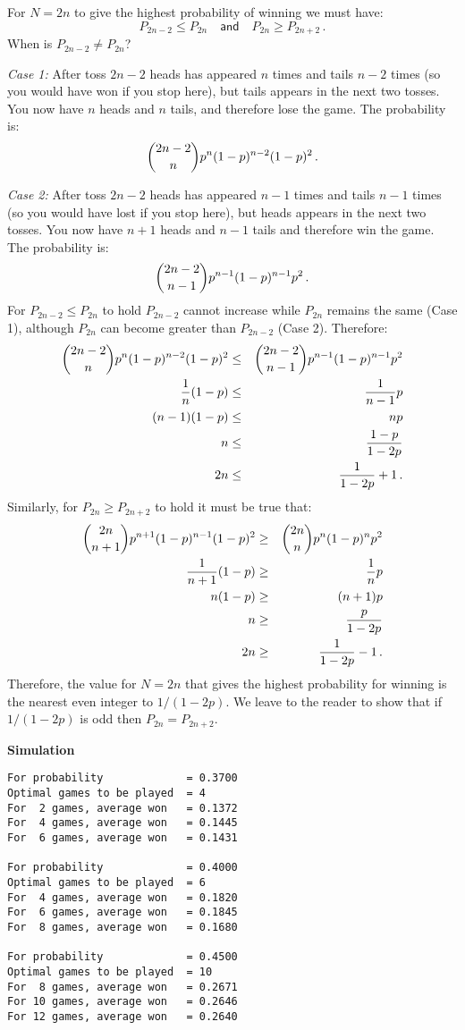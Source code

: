  For $N=2n$ to give the highest probability of winning we must have:
\[
P_{2n-2} \leq P_{2n} \quad \textsf{and} \quad P_{2n}\geq P_{2n+2}\,.
\]
When is $P_{2n-2}\not = P_{2n}$?

\textit{Case 1:}
After toss $2n-2$ heads has appeared $n$ times and tails  $n-2$ times (so you would have won if you stop here), but tails appears in the next two tosses. You now have $n$ heads and $n$ tails, and therefore lose the game. The probability is:
\[
\displaystyle{2n-2 \choose n}p^n(1-p)^{n-2} (1-p)^2\,.
\]

\textit{Case 2:}
After toss $2n-2$ heads has appeared $n-1$ times and tails $n-1$ times (so you would have lost if you stop here), but heads appears in the next two tosses. You now have $n+1$ heads and $n-1$ tails and therefore win the game. The probability is:
\[
\displaystyle{2n-2 \choose n-1}p^{n-1}(1-p)^{n-1} p^2\,.
\]
For $P_{2n-2}\leq P_{2n}$ to hold $P_{2n-2}$ cannot increase while $P_{2n}$ remains the same (Case 1), although $P_{2n}$ can become greater than $P_{2n-2}$ (Case 2). Therefore:
\begin{eqnarray*}
\displaystyle{2n-2 \choose n}p^n(1-p)^{n-2} (1-p)^2 &\leq&
\displaystyle{2n-2 \choose n-1}p^{n-1}(1-p)^{n-1} p^2\\
\displaystyle\frac{1}{n} (1-p) &\leq& \displaystyle\frac{1}{n-1} p\\
(n-1)(1-p) &\leq& np\\
n &\leq& \displaystyle\frac{1-p}{1-2p}\\
2n &\leq& \displaystyle\frac{1}{1-2p}+1\,.
\end{eqnarray*}
Similarly, for $P_{2n}\geq P_{2n+2}$ to hold it must be true that:
\begin{eqnarray*}
\displaystyle{2n \choose n+1}p^{n+1}(1-p)^{n-1}  (1-p)^2 &\geq&
\displaystyle{2n \choose n}p^{n}(1-p)^{n}  p^2\\
\displaystyle\frac{1}{n+1} (1-p) &\geq& \displaystyle\frac{1}{n} p\\
n(1-p)&\geq& (n+1)p\\
n &\geq& \displaystyle\frac{p}{1-2p}\\
2n &\geq&\displaystyle\frac{1}{1-2p}-1\,.
\end{eqnarray*}
Therefore, the value for $N=2n$ that gives the highest probability for winning is the nearest even integer to $1/(1-2p)$. We leave to the reader to show that if $1/(1-2p)$ is odd then $P_{2n}=P_{2n+2}$.

\textbf{Simulation}
\begin{verbatim}
For probability             = 0.3700
Optimal games to be played  = 4
For  2 games, average won   = 0.1372
For  4 games, average won   = 0.1445
For  6 games, average won   = 0.1431

For probability             = 0.4000
Optimal games to be played  = 6
For  4 games, average won   = 0.1820
For  6 games, average won   = 0.1845
For  8 games, average won   = 0.1680

For probability             = 0.4500
Optimal games to be played  = 10
For  8 games, average won   = 0.2671
For 10 games, average won   = 0.2646
For 12 games, average won   = 0.2640
\end{verbatim}

